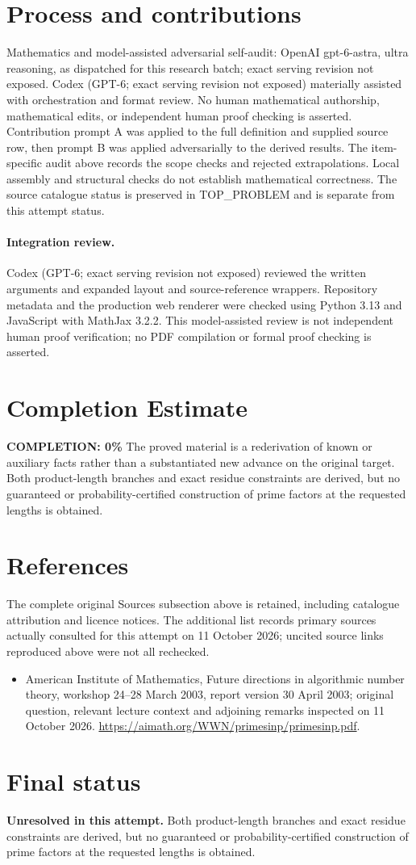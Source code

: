 \documentclass[11pt]{article}
\begin{document}
\section{Process and contributions}
Mathematics and model-assisted adversarial self-audit: OpenAI gpt-6-astra, ultra reasoning, as dispatched for this research batch; exact serving revision not exposed. Codex (GPT-6; exact serving revision not exposed) materially assisted with orchestration and format review. No human mathematical authorship, mathematical edits, or independent human proof checking is asserted.
Contribution prompt A was applied to the full definition and supplied source row, then prompt B was applied adversarially to the derived results. The item-specific audit above records the scope checks and rejected extrapolations. Local assembly and structural checks do not establish mathematical correctness. The source catalogue status is preserved in TOP\_PROBLEM and is separate from this attempt status.
\paragraph{Integration review.} Codex (GPT-6; exact serving revision not exposed) reviewed the written arguments and expanded layout and source-reference wrappers. Repository metadata and the production web renderer were checked using Python 3.13 and JavaScript with MathJax 3.2.2. This model-assisted review is not independent human proof verification; no PDF compilation or formal proof checking is asserted.

\section{Completion Estimate}
\noindent\textbf{COMPLETION: 0\%}
The proved material is a rederivation of known or auxiliary facts rather than a substantiated new advance on the original target. Both product-length branches and exact residue constraints are derived, but no guaranteed or probability-certified construction of prime factors at the requested lengths is obtained.
\section{References}
The complete original Sources subsection above is retained, including catalogue attribution and licence notices. The additional list records primary sources actually consulted for this attempt on 11 October 2026; uncited source links reproduced above were not all rechecked.
\begin{itemize}
\item American Institute of Mathematics, Future directions in algorithmic number theory, workshop 24--28 March 2003, report version 30 April 2003; original question, relevant lecture context and adjoining remarks inspected on 11 October 2026. \url{https://aimath.org/WWN/primesinp/primesinp.pdf}.
\end{itemize}
\section{Final status}
\textbf{Unresolved in this attempt.} Both product-length branches and exact residue constraints are derived, but no guaranteed or probability-certified construction of prime factors at the requested lengths is obtained.
\end{document}
